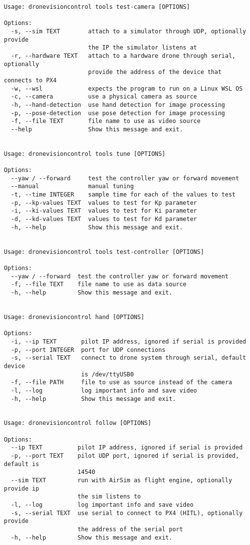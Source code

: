 \begin{verbatim}
Usage: dronevisioncontrol tools test-camera [OPTIONS]

Options:
  -s, --sim TEXT        attach to a simulator through UDP, optionally provide
                        the IP the simulator listens at
  -r, --hardware TEXT   attach to a hardware drone through serial, optionally
                        provide the address of the device that connects to PX4
  -w, --wsl             expects the program to run on a Linux WSL OS
  -c, --camera          use a physical camera as source
  -h, --hand-detection  use hand detection for image processing
  -p, --pose-detection  use pose detection for image processing
  -f, --file TEXT       file name to use as video source
  --help                Show this message and exit.


Usage: dronevisioncontrol tools tune [OPTIONS]

Options:
  --yaw / --forward     test the controller yaw or forward movement
  --manual              manual tuning
  -t, --time INTEGER    sample time for each of the values to test
  -p, --kp-values TEXT  values to test for Kp parameter
  -i, --ki-values TEXT  values to test for Ki parameter
  -d, --kd-values TEXT  values to test for Kd parameter
  -h, --help            Show this message and exit.


Usage: dronevisioncontrol tools test-controller [OPTIONS]

Options:
  --yaw / --forward  test the controller yaw or forward movement
  -f, --file TEXT    file name to use as data source
  -h, --help         Show this message and exit.


Usage: dronevisioncontrol hand [OPTIONS]

Options:
  -i, --ip TEXT       pilot IP address, ignored if serial is provided
  -p, --port INTEGER  port for UDP connections
  -s, --serial TEXT   connect to drone system through serial, default device
                      is /dev/ttyUSB0
  -f, --file PATH     file to use as source instead of the camera
  -l, --log           log important info and save video
  -h, --help          Show this message and exit.


Usage: dronevisioncontrol follow [OPTIONS]

Options:
  --ip TEXT          pilot IP address, ignored if serial is provided
  -p, --port TEXT    pilot UDP port, ignored if serial is provided, default is
                     14540
  --sim TEXT         run with AirSim as flight engine, optionally provide ip
                     the sim listens to
  -l, --log          log important info and save video
  -s, --serial TEXT  use serial to connect to PX4 (HITL), optionally provide
                     the address of the serial port
  -h, --help         Show this message and exit.
\end{verbatim}

